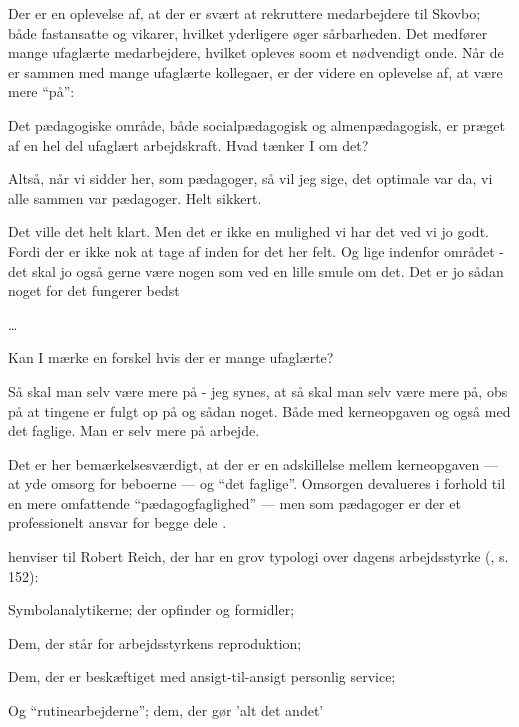 Der er en oplevelse af, at der er svært at rekruttere medarbejdere til Skovbo; både fastansatte og vikarer, hvilket yderligere øger sårbarheden.
Det medfører mange ufaglærte medarbejdere, hvilket opleves soom et nødvendigt onde.
Når de er sammen med mange ufaglærte kollegaer, er der videre en oplevelse af, at være mere “på”:

\begin{description}

\MAA
Det pædagogiske område, både socialpædagogisk og almenpædagogisk, er præget af en hel del ufaglært arbejdskraft. Hvad tænker I om det?

\DMC
Altså, når vi sidder her, som pædagoger, så vil jeg sige, det optimale var da, vi alle sammen var pædagoger. Helt sikkert.

\AMB
Det ville det helt klart. Men det er ikke en mulighed vi har det ved vi jo godt. Fordi der er ikke nok at tage af inden for det her felt.
Og lige indenfor området - det skal jo også gerne være nogen som ved en lille smule om det.
Det er jo sådan noget for det fungerer bedst

\end{description}
\ldots
\begin{description}

\MAA
Kan I mærke en forskel hvis der er mange ufaglærte?

\AMB
Så skal man selv være mere på - jeg synes, at så skal man selv være mere på, obs på at tingene er fulgt op på og sådan noget.
Både med kerneopgaven og også med det faglige.
Man er selv mere på arbejde.
\end{description}

Det er her bemærkelsesværdigt, at der er en adskillelse mellem kerneopgaven — at yde omsorg for beboerne — og “det faglige”.
Omsorgen devalueres i forhold til en mere omfattende “pædagogfaglighed” — men som pædagoger er der et professionelt ansvar for begge dele \autocite[s. ??]{frederiksenVelfaerdsprofessionerMellemOmsorg2017}.

\citeauthor{baumanLiquidModernity2000} henviser til Robert Reich, der har en grov typologi over dagens arbejdsstyrke (\citeyear{baumanLiquidModernity2000}, s. 152):

Symbolanalytikerne; der opfinder og formidler;

Dem, der står for arbejdsstyrkens reproduktion;

Dem, der er beskæftiget med ansigt-til-ansigt personlig service;

Og “rutinearbejderne”; dem, der gør 'alt det andet'

